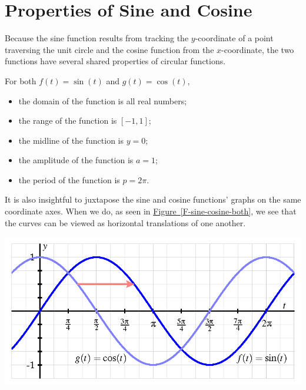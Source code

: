 \documentclass[nooutcomes]{ximera}
\begin{document}
\begin{center}  
\end{center} 


\section{Properties of Sine and Cosine}
Because the sine function results from tracking the \(y\)-coordinate of a point traversing the unit circle and the cosine function from the \(x\)-coordinate, the two functions have several shared properties of circular functions.

\begin{callout}
For both \(f(t) = \sin(t)\) and \(g(t) = \cos(t)\),%
\begin{itemize}[label=\textbullet]
\item
the domain of the function is all real numbers;%
\item
the range of the function is \([-1,1]\);%
\item
the midline of the function is \(y = 0\);%
\item
the amplitude of the function is \(a = 1\);%
\item
the period of the function is \(p = 2\pi\).%
\end{itemize}
\end{callout}

It is also insightful to juxtapose the sine and cosine functions' graphs on the same coordinate axes.  When we do, as seen in \hyperref[F-sine-cosine-both]{Figure~\ref{F-sine-cosine-both}}, we see that the curves can be viewed as horizontal translations of one another.%

\begin{image}
\includegraphics{sine-and-cosine-graphs.png}
\end{image}
\end{document}

